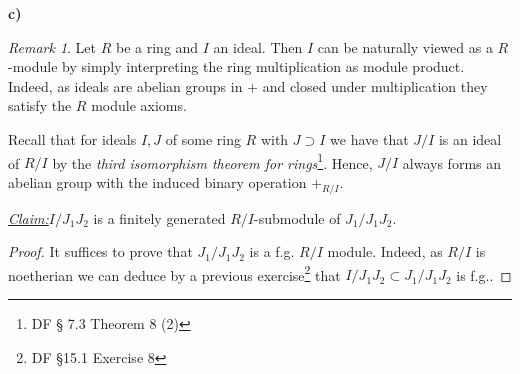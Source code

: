 \documentclass{article}
\newcommand{\claim}
{\underline{\textit{Claim:}}\hspace{0,2cm}}
\newcommand{\teilaufgabe}[1]{
{       

	\noindent\hspace*{0,1 cm}\textbf{#1)}
}
}
\theoremstyle{definition}
\theoremstyle{plain}
\theoremstyle{remark}
\newtheorem*{silentremark}{Remark}
\begin{document}
\teilaufgabe{c}
\begin{silentremark}
	Let $R$ be a ring and $I$ an ideal. Then $I$ can be naturally viewed as a $R$-module by simply interpreting the ring multiplication as module product. Indeed, as ideals are abelian groups in $+$ and closed under multiplication they satisfy the $R$ module axioms.
\end{silentremark}
Recall that for ideals $I,J$ of some ring $R$ with $J\supset I$ we have that $J/I$ is an ideal of $R/I$ by the \emph{third isomorphism theorem for rings}\footnote{DF § 7.3 Theorem 8 (2)}. Hence, $J/I$ always forms an abelian group with the induced binary operation $+_{R/I}$.

	\claim $I/J_1J_2$ is a finitely generated $R/I$-submodule of $J_1/J_1J_2$.
\begin{proof}
	It suffices to prove that $J_1/J_1J_2$ is a f.g. $R/I$ module. Indeed, as $R/I$ is noetherian we can deduce by a previous exercise\footnote{DF §15.1 Exercise 8} that $I/J_1J_2 \subset J_1/J_1J_2$ is f.g..


\end{proof}
\end{document}
